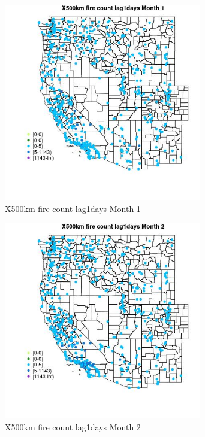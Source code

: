 \begin{figure} 
\centering  
\includegraphics[width=0.77\textwidth]{Code_Outputs/Report_ML_input_PM25_Step4_part_e_de_duplicated_aves_compiled_2019-05-14wNAs_MapObsMo1X500km_fire_count_lag1days.jpg} 
\caption{\label{fig:Report_ML_input_PM25_Step4_part_e_de_duplicated_aves_compiled_2019-05-14wNAsMapObsMo1X500km_fire_count_lag1days}X500km fire count lag1days Month 1} 
\end{figure} 
 

\clearpage 

\begin{figure} 
\centering  
\includegraphics[width=0.77\textwidth]{Code_Outputs/Report_ML_input_PM25_Step4_part_e_de_duplicated_aves_compiled_2019-05-14wNAs_MapObsMo2X500km_fire_count_lag1days.jpg} 
\caption{\label{fig:Report_ML_input_PM25_Step4_part_e_de_duplicated_aves_compiled_2019-05-14wNAsMapObsMo2X500km_fire_count_lag1days}X500km fire count lag1days Month 2} 
\end{figure} 
 

